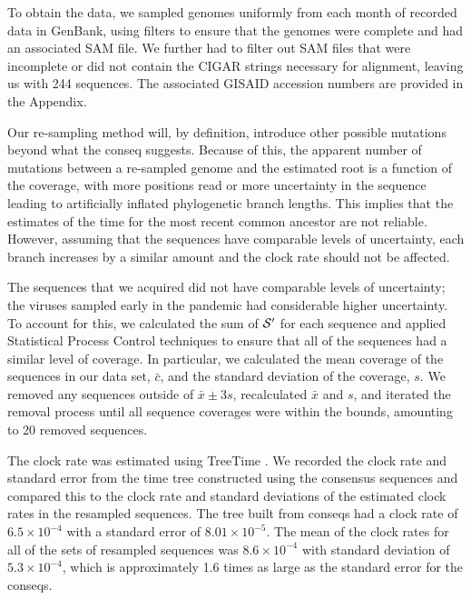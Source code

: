 \documentclass[10pt]{article}
\begin{document}
To obtain the data, we sampled genomes uniformly from each month of recorded data in GenBank, using filters to ensure that the genomes were complete and had an associated SAM file.
We further had to filter out SAM files that were incomplete or did not contain the CIGAR strings necessary for alignment, leaving us with 244 sequences.
The associated GISAID accession numbers are provided in the Appendix.

Our re-sampling method will, by definition, introduce other possible mutations beyond what the conseq suggests.
Because of this, the apparent number of mutations between a re-sampled genome and the estimated root is a function of the coverage, with more positions read or more uncertainty in the sequence leading to artificially inflated phylogenetic branch lengths.
This implies that the estimates of the time for the most recent common ancestor are not reliable.
However, assuming that the sequences have comparable levels of uncertainty, each branch increases by a similar amount and the clock rate should not be affected. 

The sequences that we acquired did not have comparable levels of uncertainty; the viruses sampled early in the pandemic had considerable higher uncertainty.
To account for this, we calculated the sum of $\mathcal{S}'$ for each sequence and applied Statistical Process Control techniques to ensure that all of the sequences had a similar level of coverage.
In particular, we calculated the mean coverage of the sequences in our data set, $\bar c$, and the standard deviation of the coverage, $s$. 
We removed any sequences outside of $\bar x \pm 3 s$, recalculated $\bar x$ and $s$, and iterated the removal process until all sequence coverages were within the bounds, amounting to 20 removed sequences.


The clock rate was estimated using TreeTime \citep{sagulenkoTreeTimeMaximumlikelihoodPhylodynamic2018}. 
We recorded the clock rate and standard error from the time tree constructed using the consensus sequences and compared this to the clock rate and standard deviations of the estimated clock rates in the resampled sequences. The tree built from conseqs had a clock rate of $6.5\times 10^{-4}$ with a standard error of $8.01\times 10^{-5}$. The mean of the clock rates for all of the sets of resampled sequences was $8.6\times 10^{-4}$ with standard deviation of $5.3\times 10^{-4}$, which is approximately 1.6 times as large as the standard error for the conseqs.
\end{document}
